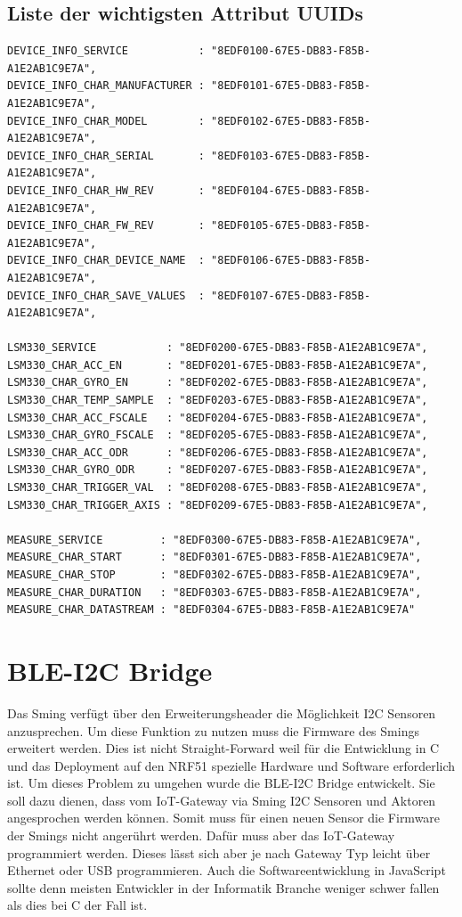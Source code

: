\subsection{Liste der wichtigsten Attribut UUIDs}
\begin{lstlisting}
DEVICE_INFO_SERVICE           : "8EDF0100-67E5-DB83-F85B-A1E2AB1C9E7A",
DEVICE_INFO_CHAR_MANUFACTURER : "8EDF0101-67E5-DB83-F85B-A1E2AB1C9E7A",
DEVICE_INFO_CHAR_MODEL        : "8EDF0102-67E5-DB83-F85B-A1E2AB1C9E7A",
DEVICE_INFO_CHAR_SERIAL       : "8EDF0103-67E5-DB83-F85B-A1E2AB1C9E7A",
DEVICE_INFO_CHAR_HW_REV       : "8EDF0104-67E5-DB83-F85B-A1E2AB1C9E7A",
DEVICE_INFO_CHAR_FW_REV       : "8EDF0105-67E5-DB83-F85B-A1E2AB1C9E7A",
DEVICE_INFO_CHAR_DEVICE_NAME  : "8EDF0106-67E5-DB83-F85B-A1E2AB1C9E7A",
DEVICE_INFO_CHAR_SAVE_VALUES  : "8EDF0107-67E5-DB83-F85B-A1E2AB1C9E7A",

LSM330_SERVICE           : "8EDF0200-67E5-DB83-F85B-A1E2AB1C9E7A",
LSM330_CHAR_ACC_EN       : "8EDF0201-67E5-DB83-F85B-A1E2AB1C9E7A",
LSM330_CHAR_GYRO_EN      : "8EDF0202-67E5-DB83-F85B-A1E2AB1C9E7A",
LSM330_CHAR_TEMP_SAMPLE  : "8EDF0203-67E5-DB83-F85B-A1E2AB1C9E7A",
LSM330_CHAR_ACC_FSCALE   : "8EDF0204-67E5-DB83-F85B-A1E2AB1C9E7A",
LSM330_CHAR_GYRO_FSCALE  : "8EDF0205-67E5-DB83-F85B-A1E2AB1C9E7A",
LSM330_CHAR_ACC_ODR      : "8EDF0206-67E5-DB83-F85B-A1E2AB1C9E7A",
LSM330_CHAR_GYRO_ODR     : "8EDF0207-67E5-DB83-F85B-A1E2AB1C9E7A",
LSM330_CHAR_TRIGGER_VAL  : "8EDF0208-67E5-DB83-F85B-A1E2AB1C9E7A",
LSM330_CHAR_TRIGGER_AXIS : "8EDF0209-67E5-DB83-F85B-A1E2AB1C9E7A",

MEASURE_SERVICE         : "8EDF0300-67E5-DB83-F85B-A1E2AB1C9E7A",
MEASURE_CHAR_START      : "8EDF0301-67E5-DB83-F85B-A1E2AB1C9E7A",
MEASURE_CHAR_STOP       : "8EDF0302-67E5-DB83-F85B-A1E2AB1C9E7A",
MEASURE_CHAR_DURATION   : "8EDF0303-67E5-DB83-F85B-A1E2AB1C9E7A",
MEASURE_CHAR_DATASTREAM : "8EDF0304-67E5-DB83-F85B-A1E2AB1C9E7A"
\end{lstlisting}

\section{BLE-I2C Bridge}
\label{bleI2cBridge}

Das Sming verfügt über den Erweiterungsheader die Möglichkeit I2C Sensoren anzusprechen. Um diese Funktion zu nutzen muss die Firmware des Smings erweitert werden. Dies ist nicht Straight-Forward weil für die Entwicklung in C und das Deployment auf den NRF51 spezielle Hardware und Software erforderlich ist. Um dieses Problem zu umgehen wurde die BLE-I2C Bridge entwickelt. Sie soll dazu dienen, dass vom IoT-Gateway via Sming I2C Sensoren und Aktoren angesprochen werden können. Somit muss für einen neuen Sensor die Firmware der Smings nicht angerührt werden. Dafür muss aber das IoT-Gateway programmiert werden. Dieses lässt sich aber je nach Gateway Typ leicht über Ethernet oder USB programmieren. Auch die Softwareentwicklung in JavaScript sollte denn meisten Entwickler in der Informatik Branche weniger schwer fallen als dies bei C der Fall ist.

